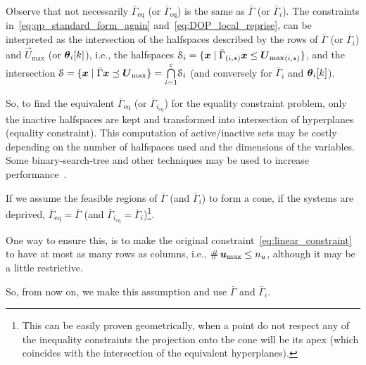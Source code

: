 \documentclass[../main.tex]{subfiles}
\begin{document}
\begin{remark}
  Observe that not necessarily $\bar{\Gamma}_{\text{eq}}$ (or $\bar{\Gamma}_{\text{eq}}$) is the same as $\bar{\Gamma}$ (or $\bar{\Gamma}_{i}$).
  The constraints in~\eqref{eq:qp_standard_form_again} and~\eqref{eq:DOP_local_reprise}, can be interpreted as the intersection of the halfspaces described by the rows of $\bar{\Gamma}$ (or $\bar{\Gamma}_{i}$) and $\vec{U}_{\max}$ (or $\thetaik$), i.e., the halfspaces
  ${\set{S}_i=\setbuild{\vec{x}}{\elem[i,\star]{{\bar{\Gamma}}}\vec{x}\leq\elem[i,\star]{\vec{U}_{\max}}}}$,
  and the intersection
  ${\set{S}=\setbuild{\vec{x}}{\bar{\Gamma}\vec{x}\preceq\vec{U}_{\max}}=\bigcap\limits_{i=1}^{c}}\set{S}_{i}$
  (and conversely for $\bar{\Gamma}_{i}$ and $\thetaik$).

  So, to find the equivalent $\bar{\Gamma}_{\text{eq}}$ (or $\bar{\Gamma}_{i_{\text{eq}}}$) for the equality constraint problem, only the inactive halfspaces are kept and transformed into intersection of hyperplanes (equality constraint).
  This computation of active/inactive sets may be costly depending on the number of halfspaces used and the dimensions of the variables.
  Some binary-search-tree and other techniques may be used to increase performance~\cite{SchulzeEtAl2022,AlessioBemporad2009}.

  If we assume the feasible regions of $\bar{\Gamma}$ (and $\bar{\Gamma}_{i}$) to form a cone, if the systems are deprived, $\bar{\Gamma}_{\text{eq}}=\bar{\Gamma}$ (and $\bar{\Gamma}_{i_\text{eq}}=\bar{\Gamma}_i$)\footnote{This can be easily proven geometrically, when a point do not respect any of the inequality constraints the projection onto the cone will be its apex (which coincides with the intersection of the equivalent hyperplanes).}.

One way to ensure this, is to make the original constraint~\eqref{eq:linear_constraint} to have at most as many rows as columns, i.e., $\card{\vec{u}_{\max}}\leq n_{u}$, although it may be a little restrictive.

So, from now on, we make this assumption and use $\bar{\Gamma}$ and $\bar{\Gamma}_{i}$.

\end{remark}
\end{document}
